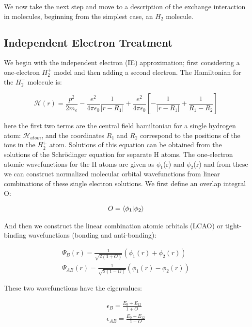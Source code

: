We now take the next step and move to a description of the exchange interaction in molecules, beginning from the simplest case, an $H_2$ molecule.

\subsection{Independent Electron Treatment}

We begin with the independent electron (IE) approximation; first considering a one-electron $H_2^+$ model and then adding a second electron. The Hamiltonian for the $H_2^+$ molecule is:

\begin{equation}
\mathscr{H}(r) = \frac{p^2}{2m_e}-\frac{e^2}{4\pi\epsilon_0}\frac{1}{|r-R_1|}+\frac{e^2}{4\pi\epsilon_0}\left[-\frac{1}{|r-R_1|}+\frac{1}{R_1-R_2}\right]
\end{equation}

here the first two terms are the central field hamiltonian for a single hydrogen atom: $\mathscr{H}_{atom}$, and the coordinates $R_1$ and $R_2$ correspond to the positions of the ions in the $H_2^+$ atom. Solutions of this equation can be obtained from the solutions of the Schr\"odinger equation for separate H atoms. The one-electron atomic wavefunctions for the H atoms are given as $\phi_1$(r) and $\phi_2$(r) and from these we can construct normalized molecular orbital wavefunctions from linear combinations of these single electron solutions. We first define an overlap integral O:

\begin{equation}
O=\braket{\phi_1|\phi_2}
\end{equation}

And then we construct the linear combination atomic orbitals (LCAO) or tight-binding wavefunctions (bonding and anti-bonding):

\begin{eqnarray}
\Psi_B(r) = \frac{1}{\sqrt{2(1+O)}}(\phi_1(r)+\phi_2(r))
\label{LCAO_B} \\
\Psi_{AB}(r) = \frac{1}{\sqrt{2(1-O)}}(\phi_1(r)-\phi_2(r))
\label{LCAO_AB}
\end{eqnarray}

These two wavefunctions have the eigenvalues:

\begin{eqnarray}
\epsilon_B=\frac{E_0+E_{12}}{1+O} \\
\epsilon_{AB}=\frac{E_0+E_{12}}{1-O}
\end{eqnarray}

